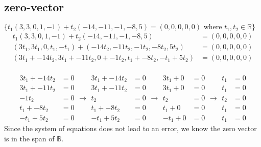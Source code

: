 \documentclass{article}
\begin{document}
\subsection{zero-vector}
$\{t_1(3,3,0,1,-1) + t_2(-14,-11,-1,-8,5) = (0, 0, 0, 0, 0) \text{ where } 
t_1,t_2 \in \mathbb{R}\}$\\
\begin{equation*}
\begin{split}
t_1(3,3,0,1,-1) + t_2(-14,-11,-1,-8,5) &= (0, 0, 0, 0, 0)\\
(3t_1,3t_1,0,t_1,-t_1) + (-14t_2,-11t_2,-1t_2,-8t_2,5t_2) &= (0, 0, 0, 0, 0)\\
(3t_1 + -14t_2, 3t_1 + -11t_2, 0 + -1t_2, t_1 + -8t_2, -t_1 + 5t_2) &= (0, 0, 0, 0, 0)
\end{split}
\end{equation*}
\\
\begin{equation*}
\begin{split}
3t_1 + -14t_2 &= 0\\
3t_1 + -11t_2 &= 0\\
-1t_2 &= 0\\
t_1 + -8t_2 &= 0\\
-t_1 + 5t_2 &= 0
\end{split}
\xrightarrow{}
\begin{split}
3t_1 + -14t_2 &= 0\\
3t_1 + -11t_2 &= 0\\
t_2 &= 0\\
t_1 + -8t_2 &= 0\\
-t_1 + 5t_2 &= 0
\end{split}
\xrightarrow{}
\begin{split}
3t_1 + 0 &= 0\\
3t_1 + 0 &= 0\\
t_2 &= 0\\
t_1 + 0 &= 0\\
-t_1 + 0 &= 0
\end{split}
\xrightarrow{}
\begin{split}
t_1 &= 0\\
t_1 &= 0\\
t_2 &= 0\\
t_1 &= 0\\
t_1 &= 0
\end{split}
\end{equation*}
Since the system of equations does not lead to an error, we know the zero vector
is in the span of $\mathbb{B}$.\\
\end{document}
